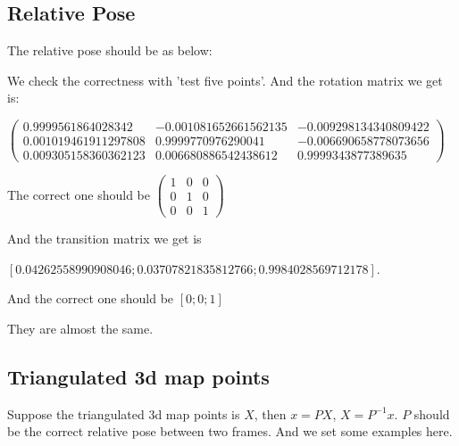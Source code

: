 \documentclass{article}
\begin{document}
\subsection{Relative Pose}
The relative pose should be as below:

We check the correctness with 'test five points'. 
And the rotation matrix we get is:

$\begin{pmatrix}
0.9999561864028342& -0.001081652661562135& -0.009298134340809422\\
0.001019461911297808& 0.9999770976290041& -0.006690658778073656 \\
0.009305158360362123&0.006680886542438612& 0.9999343877389635
\end{pmatrix}$ 

The correct one should be $\begin{pmatrix}
1& 0& 0\\
0& 1& 0\\
0&0& 1
\end{pmatrix}$

And the transition matrix we get is 

$[0.04262558990908046;
0.03707821835812766;
0.9984028569712178]$. 

And the correct one should be $[0;0;1]$

They are almost the same.

\subsection{Triangulated 3d map points}
Suppose the triangulated 3d map points is $X$, then $x = PX$, $X = P^{-1}x$. $P$ should be the correct relative pose between two frames.
And we set some examples here.


	
\end{document}
